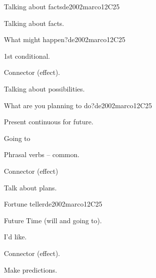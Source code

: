 \begin{syllabus}
\begin{unit}{Talking about facts}{}{de2002marco}{12}{C25}
   \begin{learningoutcomes}
      \item Talking about facts.
   \end{learningoutcomes}
\end{unit}

\begin{unit}{What might happen?}{}{de2002marco}{12}{C25}
   \begin{topics}
      \item 1st conditional.
      \item Connector (effect).
   \end{topics}

   \begin{learningoutcomes}
      \item Talking about possibilities.
   \end{learningoutcomes}
\end{unit}

\begin{unit}{What are you planning to do?}{}{de2002marco}{12}{C25}
   \begin{topics}
      \item Present continuous for future.
      \item Going to 
      \item Phrasal verbs – common.
      \item Connector (effect)
   \end{topics}

   \begin{learningoutcomes}
      \item Talk about plans.
   \end{learningoutcomes}
\end{unit}

\begin{unit}{Fortune teller}{}{de2002marco}{12}{C25}
   \begin{topics}
      \item Future Time (will and going to).
      \item I’d like.
      \item Connector (effect).
   \end{topics}

   \begin{learningoutcomes}
      \item Make predictions.
   \end{learningoutcomes}
\end{unit}


\end{syllabus}
